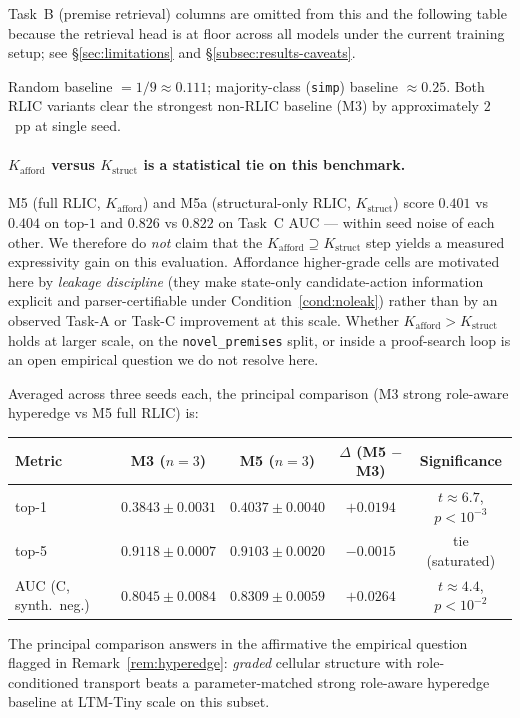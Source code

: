 \documentclass[11pt]{article}
\theoremstyle{definition}
\theoremstyle{plain}
\newcommand{\Kstruct}{K_{\mathrm{struct}}}
\newcommand{\Kafford}{K_{\mathrm{afford}}}
\begin{document}
\noindent Task~B (premise retrieval) columns are omitted from this and the
following table because the retrieval head is at floor across all models
under the current training setup; see \S\ref{sec:limitations} and
\S\ref{subsec:results-caveats}.

\noindent Random baseline $= 1/9 \approx 0.111$; majority-class
(\texttt{simp}) baseline $\approx 0.25$. Both RLIC variants clear the
strongest non-RLIC baseline (M3) by approximately $2$~pp at single seed.

\paragraph{$\Kafford$ versus $\Kstruct$ is a statistical tie on this benchmark.}
M5 (full RLIC, $\Kafford$) and M5a (structural-only RLIC, $\Kstruct$) score
$0.401$ vs $0.404$ on top-$1$ and $0.826$ vs $0.822$ on Task~C AUC — within
seed noise of each other. We therefore do \emph{not} claim that the
$\Kafford \supseteq \Kstruct$ step yields a measured expressivity gain on
this evaluation. Affordance higher-grade cells are motivated here by
\emph{leakage discipline} (they make state-only candidate-action
information explicit and parser-certifiable under
Condition~\ref{cond:noleak}) rather than by an observed Task-A or Task-C
improvement at this scale. Whether $\Kafford > \Kstruct$ holds at larger
scale, on the \texttt{novel\_premises} split, or inside a proof-search
loop is an open empirical question we do not resolve here.

\medskip
\noindent Averaged across three seeds each, the principal comparison
(M3 strong role-aware hyperedge vs M5 full RLIC) is:

\begin{center}
\small
\begin{tabular}{lcccc}
\toprule
Metric & M3 ($n{=}3$) & M5 ($n{=}3$) & $\Delta$ (M5 $-$ M3) & Significance \\
\midrule
top-1 & $0.3843 \pm 0.0031$ & $0.4037 \pm 0.0040$ & $+0.0194$ & $t \approx 6.7$, $p < 10^{-3}$ \\
top-5 & $0.9118 \pm 0.0007$ & $0.9103 \pm 0.0020$ & $-0.0015$ & tie (saturated) \\
AUC (C, synth.\ neg.) & $0.8045 \pm 0.0084$ & $0.8309 \pm 0.0059$ & $+0.0264$ & $t \approx 4.4$, $p < 10^{-2}$ \\
\bottomrule
\end{tabular}
\end{center}

\noindent The principal comparison answers in the affirmative the empirical
question flagged in Remark~\ref{rem:hyperedge}: \emph{graded} cellular
structure with role-conditioned transport beats a parameter-matched strong
role-aware hyperedge baseline at LTM-Tiny scale on this subset.
\end{document}
